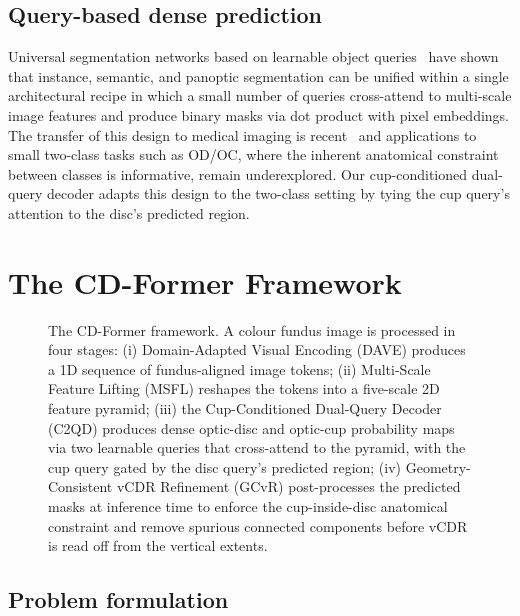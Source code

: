\documentclass[10pt,journal,twocolumn]{IEEEtran}
\begin{document}
\subsection{Query-based dense prediction}

Universal segmentation networks based on learnable object queries~\cite{cheng2022mask2former} have shown that instance, semantic, and panoptic segmentation can be unified within a single architectural recipe in which a small number of queries cross-attend to multi-scale image features and produce binary masks via dot product with pixel embeddings. The transfer of this design to medical imaging is recent~\cite{tvst_mask2former_2025} and applications to small two-class tasks such as OD/OC, where the inherent anatomical constraint between classes is informative, remain underexplored. Our cup-conditioned dual-query decoder adapts this design to the two-class setting by tying the cup query's attention to the disc's predicted region.

\section{The CD-Former Framework}
\label{sec:method}

\begin{figure}[t]
\centering
\fbox{\rule{0pt}{2.6cm}\hspace{17cm}\rule{0pt}{0pt}}
\caption{The CD-Former framework. A colour fundus image is processed in 
four stages: (i) Domain-Adapted Visual Encoding (DAVE) produces a 1D 
sequence of fundus-aligned image tokens; (ii) Multi-Scale Feature 
Lifting (MSFL) reshapes the tokens into a five-scale 2D feature pyramid; 
(iii) the Cup-Conditioned Dual-Query Decoder (C2QD) produces dense 
optic-disc and optic-cup probability maps via two learnable queries that 
cross-attend to the pyramid, with the cup query gated by the disc query's 
predicted region; (iv) Geometry-Consistent vCDR Refinement (GCvR) 
post-processes the predicted masks at inference time to enforce the 
cup-inside-disc anatomical constraint and remove spurious connected 
components before vCDR is read off from the vertical extents.}
\label{fig:arch}
\end{figure}

\subsection{Problem formulation}
\end{document}
